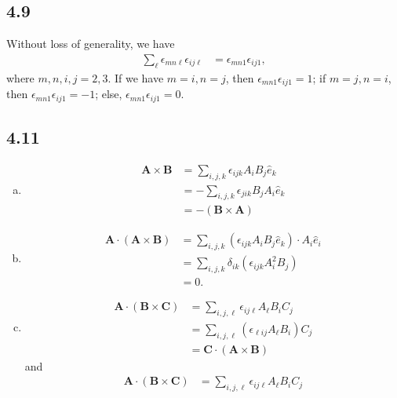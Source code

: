 \documentclass[10pt]{mypackage}
\begin{document}
\subsection{4.9}%
Without loss of generality, we have
\begin{align*}
  \sum_{\ell}\epsilon_{mn\ell}\epsilon_{ij\ell} &= \epsilon_{mn1}\epsilon_{ij1},
\end{align*}
where $m,n,i,j = 2,3$. If we have $m=i,n=j$, then $\epsilon_{mn1}\epsilon_{ij1} = 1$; if $m=j,n=i$, then $\epsilon_{mn1}\epsilon_{ij1} = -1$; else, $\epsilon_{mn1}\epsilon_{ij1} = 0$.
\subsection{4.11}%
\begin{enumerate}[(a)]
  \item 
    \begin{align*}
      \mathbf{A}\times \mathbf{B} &= \sum_{i,j,k}\epsilon_{ijk}A_iB_j\hat{e}_k\\
                &= -\sum_{i,j,k}\epsilon_{jik}B_jA_i\hat{e}_k\\
                &= -\left(\mathbf{B}\times \mathbf{A}\right)
    \end{align*}
  \item
    \begin{align*}
      \mathbf{A}\cdot \left(\mathbf{A}\times \mathbf{B}\right) &= \sum_{i,j,k}\left(\epsilon_{ijk}A_iB_j\hat{e}_k\right)\cdot A_i\hat{e}_i\\
                                                               &= \sum_{i,j,k}\delta_{ik}\left(\epsilon_{ijk}A_i^2B_j\right)\\
                                                               &= 0.
    \end{align*}
  \item 
    \begin{align*}
      \mathbf{A}\cdot \left(\mathbf{B}\times \mathbf{C}\right) &= \sum_{i,j,\ell}\epsilon_{ij\ell}A_{\ell}B_iC_j\\
                                                               &= \sum_{i,j,\ell}\left(\epsilon_{\ell i j}A_{\ell}B_i\right)C_j\\
                                                               &= \mathbf{C}\cdot \left(\mathbf{A}\times \mathbf{B}\right)
    \end{align*}
    and
    \begin{align*}
      \mathbf{A}\cdot \left(\mathbf{B}\times \mathbf{C}\right) &= \sum_{i,j,\ell}\epsilon_{ij\ell}A_{\ell}B_iC_j\\

\end{align*}
\end{enumerate}
\end{document}
